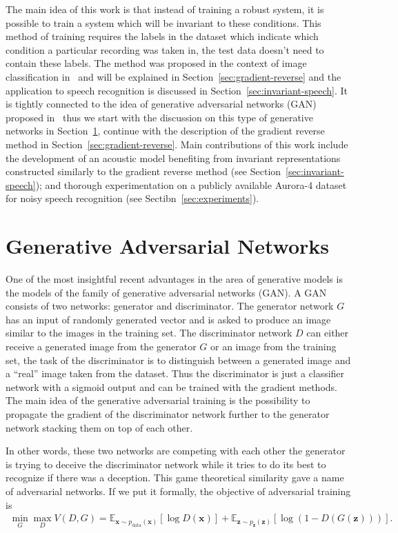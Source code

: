 \documentclass{article}
\begin{document}
    The main idea of this work is that instead of training a robust system,
    it is possible to train a system which will be invariant to these 
    conditions. This method of training requires the labels in the dataset
    which indicate which condition a particular recording was taken in, the 
    test data doesn't need to contain these labels. The method was proposed in
    the context of image classification in~\cite{ganin2014unsupervised} and 
    will be explained in Section~\ref{sec:gradient-reverse} and the application 
    to speech recognition is discussed
    in Section~\ref{sec:invariant-speech}. It is tightly connected to the idea
    of generative adversarial networks (GAN) proposed 
    in~\cite{goodfellow2014generative} thus we start with the discussion
    on this type of generative networks in Section~\ref{sec:gans}, continue
    with the description of the gradient reverse method in 
    Section~\ref{sec:gradient-reverse}. Main contributions of this work
    include the development of an acoustic model benefiting from invariant
    representations constructed similarly to the gradient reverse method
    (see Section~\ref{sec:invariant-speech}); and thorough experimentation
    on a publicly available Aurora-4 dataset for noisy speech recognition 
    (see Sectibn~\ref{sec:experiments}).

\section{Generative Adversarial Networks}
\label{sec:gans}
    One of the most insightful recent advantages in the area of generative models
    is the models of the family of generative adversarial networks (GAN).
    A GAN consists of two networks: generator and discriminator. The generator 
    network $G$ has an
    input of randomly generated vector and is asked to produce an image 
    similar to the images in the training set. The discriminator network $D$
    can either receive a generated image from the generator $G$ or an image
    from the training set, the task of the discriminator is to distinguish
    between a generated image and a ``real'' image taken from the dataset. Thus
    the discriminator is just a classifier network with a sigmoid output
    and can be trained with the gradient methods. The main idea of the generative adversarial
    training is the possibility to propagate the gradient of the discriminator
    network further to the generator network stacking them on top of each other.

    In other words, these two networks are competing with each other the 
    generator is trying to deceive the discriminator network while it tries
    to do its best to recognize if there was a deception. This game theoretical
    similarity gave a name of adversarial networks. If we put it formally, the 
    objective of adversarial training is
    \begin{align*}
        \min_G \max_D V(D, G) = \mathbb{E}_{\bm{x} \sim p_{\text{data}}(\bm{x})}[\log D(\bm{x})] + 
            \mathbb{E}_{\bm{z} \sim p_{\bm{z}}(\bm{z})}[\log (1 - D(G(\bm{z})))].
    \end{align*}
\end{document}

